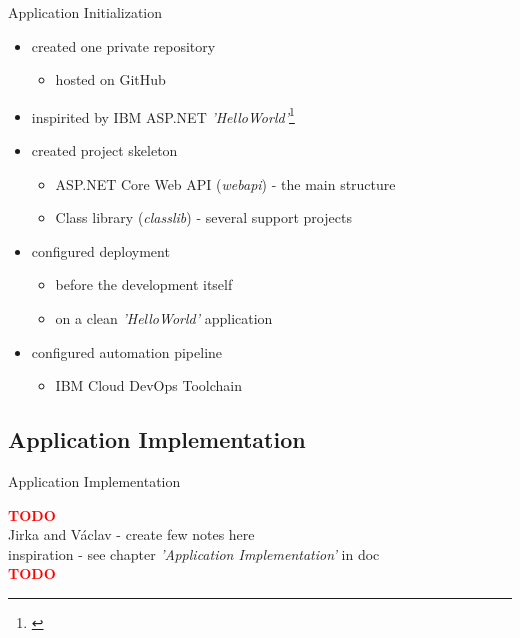 \documentclass[]{beamer}
\newcommand{\TODO}{\textbf{\textcolor{red}{TODO}}} %
\begin{document}
    \begin{frame}{Application Initialization}
      \begin{itemize}
        \item created one private repository
        \begin{itemize}
          \item hosted on GitHub
        \end{itemize}
        \item inspirited by IBM ASP.NET \textit{'HelloWorld'}\footnote{\href{https://github.com/IBM-Cloud/aspnet-core-helloworld}{\color{urlcolor}{github.com/IBM-Cloud/aspnet-core-helloworld}}}
        \item created project skeleton
        \begin{itemize}
          \item ASP.NET Core Web API (\textit{webapi}) - the main structure
          \item Class library (\textit{classlib}) - several support projects
        \end{itemize}
        \item configured deployment
        \begin{itemize}
          \item before the development itself
          \item on a clean \textit{'HelloWorld'} application
        \end{itemize}
        \item configured automation pipeline
        \begin{itemize}
          \item IBM Cloud DevOps Toolchain
        \end{itemize}
      \end{itemize}
    \end{frame}

  \subsection{Application Implementation}

    \begin{frame}{Application Implementation}
      \begin{center}
        \TODO\\
        Jirka and Václav - create few notes here\\
        inspiration - see chapter \textit{'Application Implementation'} in doc\\
        \TODO
      \end{center}
    \end{frame}
\end{document}
